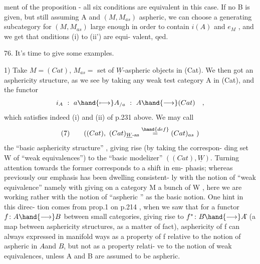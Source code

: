 
ment of the proposition - all six conditions are equivalent in this case.
If no B is given, but still assuming A and $(M,M_{as})$ aspheric, we can
choose a generating subcategory for $(M,M_{as})$ large enough in order to
contain $i(A)$ and $e_M$ , and we get that onditions (i) to (ii') are equi-%
valent, qed.

76. It's time to give some examples.

1) Take $M = (Cat)$, $M_{as} =$ set of $\underline{W}$-aspheric objects in (Cat). We
then got an asphericity structure, as we see by taking any weak test
category A in (Cat), and the functor
\[ i_A \ : \ a \hand{\longmapsto} A_{/a} \ : \ A \hand{\longrightarrow} (Cat) \quad , \]
which satisfies indeed (i) and (ii) of p.231 above.\margin{//} We may call
\[ (7) \qquad ((Cat),\ (Cat)_{\underline{W}\text{-as}} \overset{\hand{def}}{=} (Cat)_{as} \ ) \]
the ``basic asphericity structure'' , giving rise (by taking the correspon-%
ding set W of ``weak equivalences'') to the ``basic modelizer''\deleted{\unsure{,}} $((Cat), \underline{W})$.
Turning attention  towards the former corresponds to a shift in em-%
phasis; whereas previously our emphasis has  been dwelling consistent-%
ly with the notion of ``weak equivalence''\hand{,} namely with  giving on a
category M a bunch of \hand{\uline{\textcolor{black}{arrows}}} W , here we are  working rather with the
notion of ``aspheric \hand{\uline{\textcolor{black}{objects}}}'' as the basic notion. One hint in this direc-%
tion comes from prop.1  on p.214 , when we saw that for a functor
$f\colon A \hand{\longrightarrow} B$ between small categories, giving rise to $f^{*}\colon B\hat{} \hand{\longrightarrow} A\hat{}$ (a map
 between asphericity structures, as a matter of fact), asphericity of f
can  always expressed in manifold ways as a property of f relative to
the notion of aspheric \hand{\uline{\textcolor{black}{objects}}} in $A\hat{}$and $B\hat{}$, but not as a property relati-%
ve to the notion of weak equivalences, unless A and B are assumed to be
aspheric.

